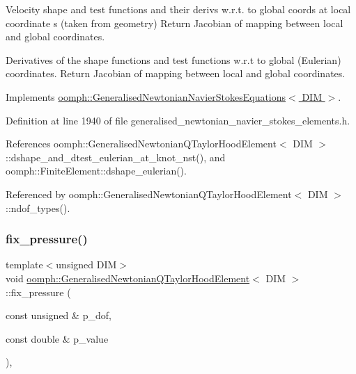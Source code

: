 Velocity shape and test functions and their derivs w.\+r.\+t. to global coords at local coordinate s (taken from geometry) Return Jacobian of mapping between local and global coordinates. 

Derivatives of the shape functions and test functions w.\+r.\+t to global (Eulerian) coordinates. Return Jacobian of mapping between local and global coordinates. 

Implements \hyperlink{classoomph_1_1GeneralisedNewtonianNavierStokesEquations_a2607956e6619a4d3ef900bf65dd1ee8f}{oomph\+::\+Generalised\+Newtonian\+Navier\+Stokes\+Equations$<$ D\+I\+M $>$}.



Definition at line 1940 of file generalised\+\_\+newtonian\+\_\+navier\+\_\+stokes\+\_\+elements.\+h.



References oomph\+::\+Generalised\+Newtonian\+Q\+Taylor\+Hood\+Element$<$ D\+I\+M $>$\+::dshape\+\_\+and\+\_\+dtest\+\_\+eulerian\+\_\+at\+\_\+knot\+\_\+nst(), and oomph\+::\+Finite\+Element\+::dshape\+\_\+eulerian().



Referenced by oomph\+::\+Generalised\+Newtonian\+Q\+Taylor\+Hood\+Element$<$ D\+I\+M $>$\+::ndof\+\_\+types().

\mbox{\label{classoomph_1_1GeneralisedNewtonianQTaylorHoodElement_afdaae310f7879fb9191b730cdf81ade1}} 
\subsubsection{\texorpdfstring{fix\+\_\+pressure()}{fix\_pressure()}}
{\footnotesize\ttfamily template$<$unsigned D\+IM$>$ \\
void \hyperlink{classoomph_1_1GeneralisedNewtonianQTaylorHoodElement}{oomph\+::\+Generalised\+Newtonian\+Q\+Taylor\+Hood\+Element}$<$ D\+IM $>$\+::fix\+\_\+pressure (\begin{DoxyParamCaption}\item[{const unsigned \&}]{p\+\_\+dof,  }\item[{const double \&}]{p\+\_\+value }\end{DoxyParamCaption})\hspace{0.3cm}{\ttfamily [inline]}, {\ttfamily [virtual]}}



